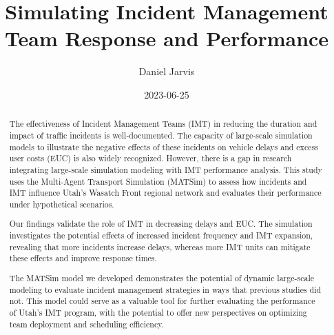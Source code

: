 \documentclass[fancy, oneside, mastersfancy, ms]{byuthesis}
\title{Simulating Incident Management Team Response and Performance}
\author{Daniel Jarvis}
\date{2023-06-25}
\begin{document}
\frontmatter
\titlepage
\cleardoublepage

\customtitlepage
\cleardoublepage


  \begin{abstract}
The effectiveness of Incident Management Teams (IMT) in reducing the
duration and impact of traffic incidents is well-documented. The
capacity of large-scale simulation models to illustrate the negative
effects of these incidents on vehicle delays and excess user costs (EUC)
is also widely recognized. However, there is a gap in research
integrating large-scale simulation modeling with IMT performance
analysis. This study uses the Multi-Agent Transport Simulation (MATSim)
to assess how incidents and IMT influence Utah's Wasatch Front regional
network and evaluates their performance under hypothetical scenarios.

Our findings validate the role of IMT in decreasing delays and EUC. The
simulation investigates the potential effects of increased incident
frequency and IMT expansion, revealing that more incidents increase
delays, whereas more IMT units can mitigate these effects and improve
response times.

The MATSim model we developed demonstrates the potential of dynamic
large-scale modeling to evaluate incident management strategies in ways
that previous studies did not. This model could serve as a valuable tool
for further evaluating the performance of Utah's IMT program, with the
potential to offer new perspectives on optimizing team deployment and
scheduling efficiency.
\end{abstract}
\cleardoublepage
\end{document}
